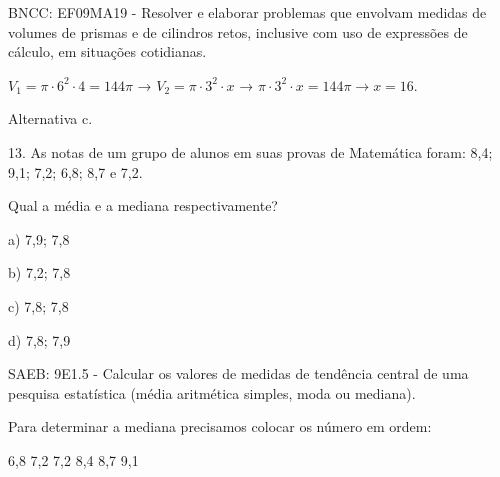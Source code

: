 \begin{escolha}
\begin{boxmedio}
\begin{boxmedio}
{\begin{boxpeq}
\begin{boxpeq}
{\begin{boxpeq}
\begin{boxmedio}
\begin{boxmedio}
\begin{boxpeq}
\begin{boxmedio}
\begin{boxpeq}
\begin{boxpeq}
\begin{boxpeq}
\begin{boxpeq}
\begin{boxmedio}
{\begin{boxmedio}
\begin{boxmedio}
\begin{boxpeq}
\begin{boxmedio}
\begin{boxpeq}
\begin{boxpeq}
\begin{boxpeq}
\begin{escolha}
{\begin{boxmedio}
\begin{boxpeq}
\begin{boxpeq}
\begin{boxpeq}
\begin{boxpeq}
\begin{boxpeq}
\begin{boxmedio}
\begin{boxpeq}
\begin{boxpeq}
\begin{boxpeq}
{\begin{boxpeq}
\begin{boxmedio}
\begin{boxpeq}
\begin{boxpeq}
\begin{boxpeq}
{\begin{boxpeq}
\begin{boxmedio}
{\begin{boxpeq}
\begin{boxpeq}
\begin{boxmedio}
\begin{boxmedio}
\begin{boxpeq}
\begin{boxpeq}
{\begin{boxpeq}
\begin{boxpeq}
\begin{boxpeq}
\begin{boxpeq}
\begin{boxpeq}
\begin{escolha}
\begin{escolha}
{\begin{boxmedio}
\begin{boxpeq}
\begin{q°}
\begin{boxmedio}
\begin{boxpeq}
\begin{boxpeq}
\begin{boxmedio}
\begin{boxmedio}
\begin{boxmedio}
\begin{boxmedio}
{\begin{escolha}
\begin{escolha}
\begin{escolha}
\begin{escolha}
\begin{escolha}
\begin{escolha}
{BNCC: EF09MA19 - Resolver e elaborar problemas que envolvam medidas de
volumes de prismas e de cilindros retos, inclusive com uso de expressões
de cálculo, em situações cotidianas.

$V_{1} = \pi \cdot 6^{2} \cdot 4 = 144\pi$ →
$V_{2} = \pi \cdot 3^{2} \cdot x$ →
$\pi \cdot 3^{2} \cdot x = 144\pi \rightarrow x = 16.$

Alternativa c.

13. As notas de um grupo de alunos em suas provas de Matemática foram:
8,4; 9,1; 7,2; 6,8; 8,7 e 7,2.

Qual a média e a mediana respectivamente?

a) 7,9; 7,8

b) 7,2; 7,8

c) 7,8; 7,8

d) 7,8; 7,9

SAEB: 9E1.5 - Calcular os valores de medidas de tendência central de uma
pesquisa estatística (média aritmética simples, moda ou mediana).

Para determinar a mediana precisamos colocar os número em ordem:

6,8 7,2 7,2 8,4 8,7 9,1

}
\end{escolha}
\end{escolha}
\end{escolha}
\end{escolha}
\end{escolha}
\end{escolha}}
\end{boxmedio}
\end{boxmedio}
\end{boxmedio}
\end{boxmedio}
\end{boxpeq}
\end{boxpeq}
\end{boxmedio}
\end{q°}
\end{boxpeq}
\end{boxmedio}}
\end{escolha}
\end{escolha}
\end{boxpeq}
\end{boxpeq}
\end{boxpeq}
\end{boxpeq}
\end{boxpeq}}
\end{boxpeq}
\end{boxpeq}
\end{boxmedio}
\end{boxmedio}
\end{boxpeq}
\end{boxpeq}}
\end{boxmedio}
\end{boxpeq}}
\end{boxpeq}
\end{boxpeq}
\end{boxpeq}
\end{boxmedio}
\end{boxpeq}}
\end{boxpeq}
\end{boxpeq}
\end{boxpeq}
\end{boxmedio}
\end{boxpeq}
\end{boxpeq}
\end{boxpeq}
\end{boxpeq}
\end{boxpeq}
\end{boxmedio}}
\end{escolha}
\end{boxpeq}
\end{boxpeq}
\end{boxpeq}
\end{boxmedio}
\end{boxpeq}
\end{boxmedio}
\end{boxmedio}}
\end{boxmedio}
\end{boxpeq}
\end{boxpeq}
\end{boxpeq}
\end{boxpeq}
\end{boxmedio}
\end{boxpeq}
\end{boxmedio}
\end{boxmedio}
\end{boxpeq}}
\end{boxpeq}
\end{boxpeq}}
\end{boxmedio}
\end{boxmedio}
\end{escolha}
